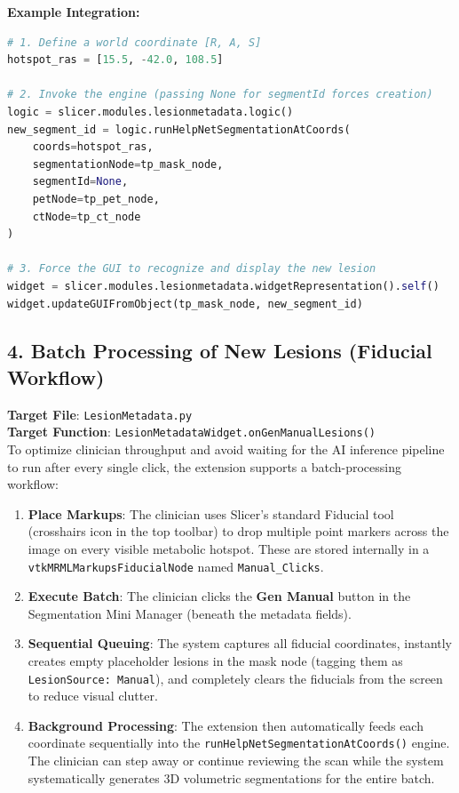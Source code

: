 \documentclass[a4paper,10pt]{article}
\begin{document}
\textbf{Example Integration:}
\begin{lstlisting}[language=Python]
# 1. Define a world coordinate [R, A, S]
hotspot_ras = [15.5, -42.0, 108.5]

# 2. Invoke the engine (passing None for segmentId forces creation)
logic = slicer.modules.lesionmetadata.logic()
new_segment_id = logic.runHelpNetSegmentationAtCoords(
    coords=hotspot_ras,
    segmentationNode=tp_mask_node,
    segmentId=None,
    petNode=tp_pet_node,
    ctNode=tp_ct_node
)

# 3. Force the GUI to recognize and display the new lesion
widget = slicer.modules.lesionmetadata.widgetRepresentation().self()
widget.updateGUIFromObject(tp_mask_node, new_segment_id)
\end{lstlisting}

\subsection{4. Batch Processing of New Lesions (Fiducial Workflow)}
\textbf{Target File}: \texttt{LesionMetadata.py} \\
\textbf{Target Function}: \texttt{LesionMetadataWidget.onGenManualLesions()} \\
To optimize clinician throughput and avoid waiting for the AI inference pipeline to run after every single click, the extension supports a batch-processing workflow:
\begin{enumerate}
    \item \textbf{Place Markups}: The clinician uses Slicer's standard Fiducial tool (crosshairs icon in the top toolbar) to drop multiple point markers across the image on every visible metabolic hotspot. These are stored internally in a \texttt{vtkMRMLMarkupsFiducialNode} named \texttt{Manual\_Clicks}.
    \item \textbf{Execute Batch}: The clinician clicks the \textbf{Gen Manual} button in the Segmentation Mini Manager (beneath the metadata fields).
    \item \textbf{Sequential Queuing}: The system captures all fiducial coordinates, instantly creates empty placeholder lesions in the mask node (tagging them as \texttt{LesionSource: Manual}), and completely clears the fiducials from the screen to reduce visual clutter.
    \item \textbf{Background Processing}: The extension then automatically feeds each coordinate sequentially into the \texttt{runHelpNetSegmentationAtCoords()} engine. The clinician can step away or continue reviewing the scan while the system systematically generates 3D volumetric segmentations for the entire batch.
\end{enumerate}
\end{document}
